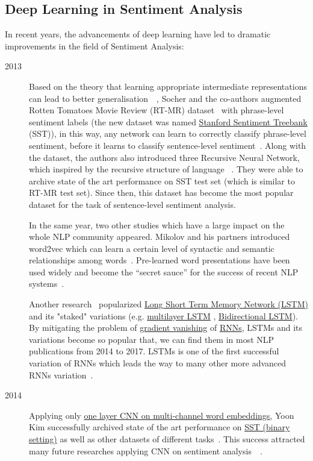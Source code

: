 \subsection{Deep Learning in Sentiment Analysis}
In recent years, the advancements of deep learning have led to dramatic improvements in the field of Sentiment Analysis:
\begin{description}
\item [2013] Based on the theory that learning appropriate intermediate representations can lead to better generalisation~\cite{knowledge-matter}~\cite{tran-auto-encoder}, Socher and the co-authors augmented Rotten Tomatoes Movie Review  (RT-MR) dataset~\cite{Rotten-Tomato} with phrase-level sentiment labels (the new dataset was named \hyperref[sec:sst]{Stanford Sentiment Treebank} (SST)), in this way, any network can learn to correctly classify phrase-level sentiment, before it learns to classify sentence-level sentiment~\cite{socher2013recursive}. Along with the dataset, the authors also introduced three Recursive Neural Network, which inspired by the recursive structure of language ~\cite{socher2013recursive}.
They were able to archive state of the art performance on SST test set (which is similar to RT-MR test set).
Since then, this dataset has become the most popular dataset for the task of sentence-level sentiment analysis.

In the same year, two other studies which have a large impact on the whole NLP community appeared.
Mikolov and his partners introduced word2vec which can learn a certain level of syntactic and semantic relationships among words~\cite{word2vec}.
Pre-learned word presentations have been used widely and become the “secret sauce” for the success of recent NLP systems~\cite{Luong_betterword}.

Another research~\cite{GravesLSTM} popularized \hyperref[sec:lstm]{Long Short Term Memory Network (LSTM)} and its "staked" variations (e.g. \hyperref[sec:multilayer-lstm]{multilayer LSTM} , \hyperref[sec:bilstm]{Bidirectional LSTM}).
By mitigating the problem of \hyperref[sec:gradient-vanish]{gradient vanishing} of \hyperref[sec:RNN]{RNNs}, LSTMs and its variations become so popular that, we can find them in most NLP publications from 2014 to 2017.
LSTMs is one of the first successful variation of RNNs which leads the way to many other more advanced RNNs variation~\cite{olah2016attention}.

\item [2014] Applying only \hyperref[kim-cnn]{one layer CNN on multi-channel word embeddings}, Yoon Kim successfully archived state of the art performance on \hyperref[sec:sst]{SST (binary setting)} as well as other datasets of different tasks~\cite{KimCNN}.
This success attracted many future researches applying CNN on sentiment analysis~\cite{2-layer-cnn}~\cite{cnn-rnn}.


\end{description}
